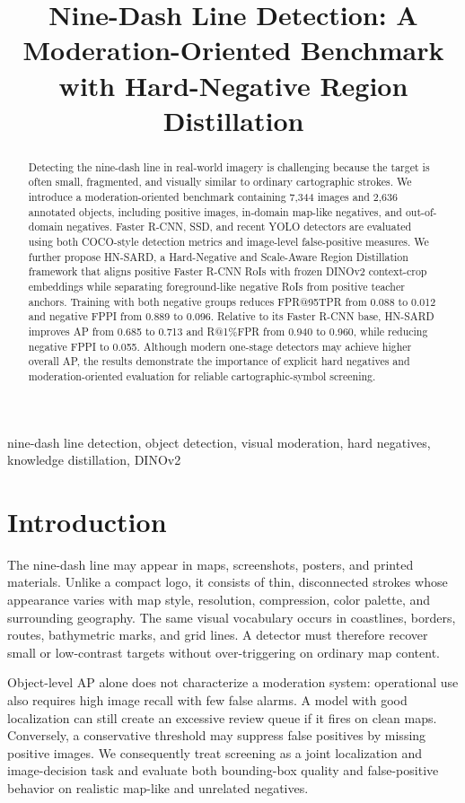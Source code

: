 \documentclass[conference,a4paper]{IEEEtran}
\title{Nine-Dash Line Detection: A Moderation-Oriented Benchmark with Hard-Negative Region Distillation}
\author{
\IEEEauthorblockN{First Author\IEEEauthorrefmark{1}, Second Author\IEEEauthorrefmark{2}, and Third Author\IEEEauthorrefmark{1}}
\IEEEauthorblockA{\IEEEauthorrefmark{1}Department or Laboratory, University or Organization\\
Email: first.author@example.edu, third.author@example.edu}
\IEEEauthorblockA{\IEEEauthorrefmark{2}Department or Laboratory, University or Organization\\
Email: second.author@example.edu}
}
\begin{document}
\maketitle

\begin{abstract}
Detecting the nine-dash line in real-world imagery is challenging because the target is often small, fragmented, and visually similar to ordinary cartographic strokes. We introduce a moderation-oriented benchmark containing 7,344 images and 2,636 annotated objects, including positive images, in-domain map-like negatives, and out-of-domain negatives. Faster R-CNN, SSD, and recent YOLO detectors are evaluated using both COCO-style detection metrics and image-level false-positive measures. We further propose HN-SARD, a Hard-Negative and Scale-Aware Region Distillation framework that aligns positive Faster R-CNN RoIs with frozen DINOv2 context-crop embeddings while separating foreground-like negative RoIs from positive teacher anchors. Training with both negative groups reduces FPR@95TPR from 0.088 to 0.012 and negative FPPI from 0.889 to 0.096. Relative to its Faster R-CNN base, HN-SARD improves AP from 0.685 to 0.713 and R@1\%FPR from 0.940 to 0.960, while reducing negative FPPI to 0.055. Although modern one-stage detectors may achieve higher overall AP, the results demonstrate the importance of explicit hard negatives and moderation-oriented evaluation for reliable cartographic-symbol screening.
\end{abstract}

\begin{IEEEkeywords}
nine-dash line detection, object detection, visual moderation, hard negatives, knowledge distillation, DINOv2
\end{IEEEkeywords}

\section{Introduction}
The nine-dash line may appear in maps, screenshots, posters, and printed materials. Unlike a compact logo, it consists of thin, disconnected strokes whose appearance varies with map style, resolution, compression, color palette, and surrounding geography. The same visual vocabulary occurs in coastlines, borders, routes, bathymetric marks, and grid lines. A detector must therefore recover small or low-contrast targets without over-triggering on ordinary map content.

Object-level AP alone does not characterize a moderation system: operational use also requires high image recall with few false alarms. A model with good localization can still create an excessive review queue if it fires on clean maps. Conversely, a conservative threshold may suppress false positives by missing positive images. We consequently treat screening as a joint localization and image-decision task and evaluate both bounding-box quality and false-positive behavior on realistic map-like and unrelated negatives.
\end{document}

